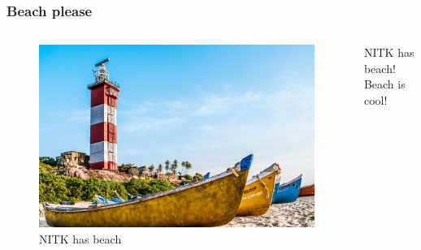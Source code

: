 \documentclass{beamer}
\begin{document}

\begin{frame}
\frametitle{Beach please}

\begin{columns}

\begin{figure}
    \centering
    \includegraphics[width=\columnwidth]{./figures/image_lh.jpg}
    \caption{NITK has beach}
    \label{fig:lighthouse}
\end{figure}

NITK has beach! Beach is cool!

\end{columns}
\end{frame}
\end{document}
